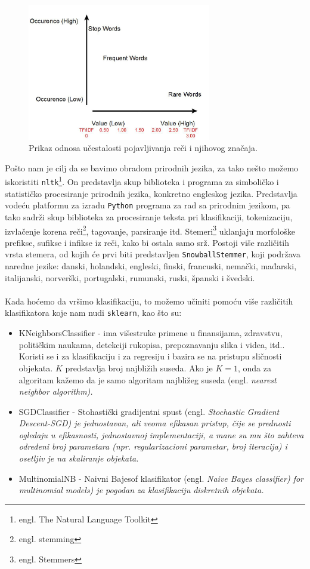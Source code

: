 \documentclass[a4paper]{article}
\begin{document}
\begin{figure}[t]
\includegraphics[width=8cm]{Pictures/slika1.png}
\centering
\caption{Prikaz odnosa učestalosti pojavljivanja reči i njihovog značaja.}
\end{figure}

Pošto nam je cilj da se bavimo obradom prirodnih jezika, za tako nešto možemo iskoristiti \texttt{nltk}\footnote{engl. The Natural Language Toolkit}. On predstavlja skup biblioteka i programa za simboličko i statističko procesiranje prirodnih jezika, konkretno engleskog jezika. Predstavlja vodeću platformu za izradu \texttt{Python} programa za rad sa prirodnim jezikom, pa tako sadrži skup biblioteka za procesiranje teksta pri klasifikaciji, tokenizaciju, izvlačenje korena reči\footnote{engl. stemming}, tagovanje, parsiranje itd. Stemeri\footnote{engl. Stemmers} uklanjaju morfološke prefikse, sufikse i infikse iz reči, kako bi ostala samo srž. Postoji više različitih vrsta stemera, od kojih će prvi biti predstavljen \texttt{SnowballStemmer}, koji podržava naredne jezike: danski, holandski, engleski, finski, francuski, nemački, mađarski, italijanski, norverški, portugalski, rumunski, ruski, španski i švedski.\\\\
Kada hoćemo da vršimo klasifikaciju, to možemo učiniti pomoću više različitih klasifikatora koje nam nudi \texttt{sklearn}, kao što su:
\begin{itemize}
\item KNeighborsClassifier - ima višestruke primene u finansijama, zdravstvu, političkim naukama, detekciji rukopisa, prepoznavanju slika i videa, itd.. Koristi se i za klasifikaciju i za regresiju i bazira se na pristupu sličnosti objekata. $K$ predstavlja broj najbližih suseda. Ako je $K=1$, onda za algoritam kažemo da je samo algoritam najbližeg suseda (engl. \em{nearest neighbor algorithm}).
\item SGDClassifier - Stohastički gradijentni spust (engl. \em{Stochastic Gradient Descent-SGD}) je jednostavan, ali veoma efikasan pristup, čije se prednosti ogledaju u efikasnosti, jednostavnoj implementaciji, a mane su mu što zahteva određeni broj parametara (npr. regularizacioni parametar, broj iteracija) i osetljiv je na skaliranje objekata. 
\item MultinomialNB - Naivni Bajesof klasifikator (engl. \em{Naive Bayes classifier}) for multinomial models) je pogodan za klasifikaciju diskretnih objekata. 
\end{itemize}
\end{document}
